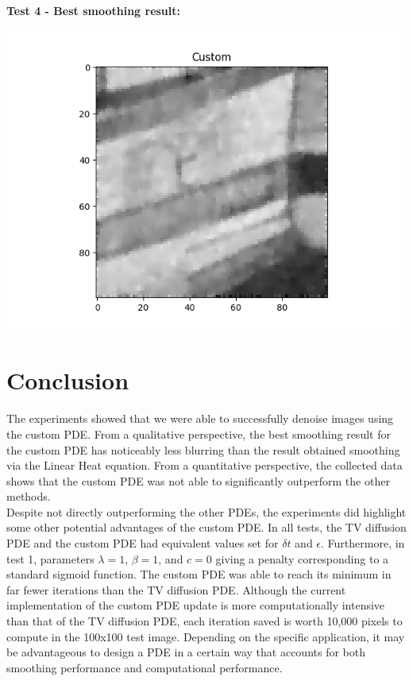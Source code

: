 \documentclass{article}
\begin{document}
  \vspace{12 pt}
  \noindent \textbf{Test 4 - Best smoothing result:}
  \begin{center}
    \includegraphics[width=\textwidth]{../generated_images/Custom_test4.png}
  \end{center}


  \newpage
  \section{Conclusion}

  \noindent
  The experiments showed that we were able to successfully
  denoise images using the custom PDE. From a qualitative
  perspective, the best smoothing result for the custom PDE
  has noticeably less blurring than the result obtained smoothing via
  the Linear Heat equation. From a quantitative perspective, the
  collected data shows that the custom PDE was not able to
  significantly outperform the other methods.\\

  \noindent
  Despite not directly outperforming the other PDEs, the experiments did highlight some
  other potential advantages of the custom PDE.
  In all tests, the TV diffusion PDE and the custom PDE had equivalent values set for
  $\delta t$ and $\epsilon$. Furthermore, in test 1, parameters $\lambda = 1$, $\beta=1$,
  and $c=0$ giving a penalty corresponding to a standard sigmoid function. The custom
  PDE was able to reach its minimum in far fewer iterations than the TV diffusion PDE.
  Although the current implementation of the custom PDE update is more computationally
  intensive than that of the TV diffusion PDE, each iteration saved is worth 10,000
  pixels to compute in the 100x100 test image. Depending on the specific
  application, it may be advantageous to design a PDE in a certain way
  that accounts for both smoothing performance and computational performance.\\
\end{document}
